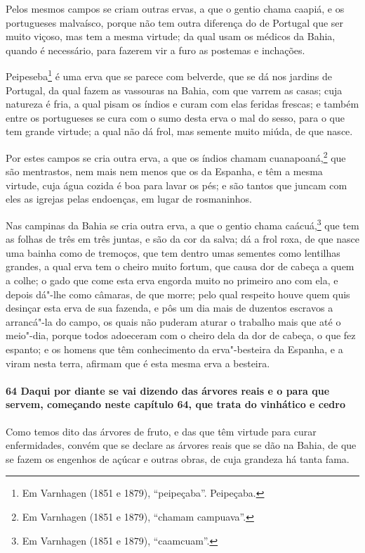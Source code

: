 \begin{linenumbers}
Pelos mesmos campos se criam outras ervas, a que o gentio chama caapiá, e os portugueses
malvaísco, porque não tem outra diferença do de Portugal que ser muito viçoso, mas tem a
mesma virtude; da qual usam os médicos da Bahia, quando é necessário, para fazerem vir a
furo as postemas e inchações.

Peipeseba\footnote{ Em Varnhagen (1851 e 1879), ``peipeçaba''. Peipeçaba.} é uma erva que
se parece com belverde, que se dá nos jardins de Portugal, da qual fazem as vassouras na
Bahia, com que varrem as casas; cuja natureza é fria, a qual pisam os índios e curam com
elas feridas frescas; e também entre os portugueses se cura com o sumo desta erva o mal do
sesso, para o que tem grande virtude; a qual não dá frol, mas semente muito miúda, de que
nasce.

Por estes campos se cria outra erva, a que os índios chamam cuanapoaná,\footnote{ Em
Varnhagen (1851 e 1879), ``chamam campuava''.} que são mentrastos, nem mais nem menos que
os da Espanha, e têm a mesma virtude, cuja água cozida é boa para lavar os pés; e são
tantos que juncam com eles as igrejas pelas endoenças, em lugar de rosmaninhos.

Nas campinas da Bahia se cria outra erva, a que o gentio chama caácuá,\footnote{ Em
Varnhagen (1851 e 1879), ``caamcuam''.} que tem as folhas de três em três juntas, e são da
cor da salva; dá a frol roxa, de que nasce uma bainha como de tremoços, que tem dentro
umas sementes como lentilhas grandes, a qual erva tem o cheiro muito fortum, que causa dor
de cabeça a quem a colhe; o gado que come esta erva engorda muito no primeiro ano com ela,
e depois dá"-lhe como câmaras, de que morre; pelo qual respeito houve quem quis desinçar
esta erva de sua fazenda, e pôs um dia mais de duzentos escravos a arrancá"-la do campo, os
quais não puderam aturar o trabalho mais que até o meio"-dia, porque todos adoeceram com o
cheiro dela da dor de cabeça, o que fez espanto; e os homens que têm conhecimento da
erva"-besteira da Espanha, e a viram nesta terra, afirmam que é esta mesma erva a besteira.

\paragraph{64 Daqui por diante se vai dizendo das árvores reais e o para que servem,
começando neste capítulo 64, que trata do vinhático e cedro}\quad
Como temos dito das árvores de fruto, e das que têm virtude para curar enfermidades,
convém que se declare as árvores reais que se dão na Bahia, de que se fazem os engenhos de
açúcar e outras obras, de cuja grandeza há tanta fama.


\end{linenumbers}
